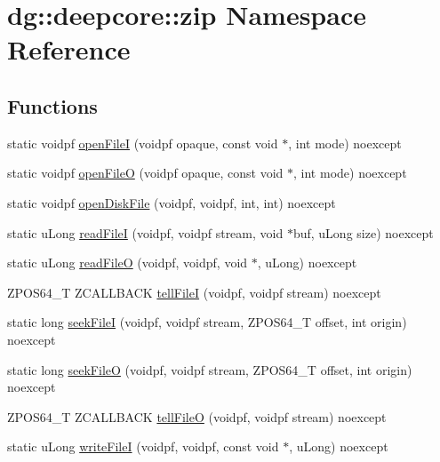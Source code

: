 \hypertarget{namespacedg_1_1deepcore_1_1zip}{}\section{dg\+:\+:deepcore\+:\+:zip Namespace Reference}
\label{namespacedg_1_1deepcore_1_1zip}
\subsection*{Functions}
\begin{DoxyCompactItemize}
\item 
static voidpf \hyperlink{namespacedg_1_1deepcore_1_1zip_a3bc0ad7151257370d5b5751db50e2d39}{open\+FileI} (voidpf opaque, const void $\ast$, int mode) noexcept
\item 
static voidpf \hyperlink{namespacedg_1_1deepcore_1_1zip_a878b1c478e1a8e98b5f336c7f6d0a231}{open\+FileO} (voidpf opaque, const void $\ast$, int mode) noexcept
\item 
static voidpf \hyperlink{namespacedg_1_1deepcore_1_1zip_a078759b4d07a1c6c6cc4b17132578548}{open\+Disk\+File} (voidpf, voidpf, int, int) noexcept
\item 
static u\+Long \hyperlink{namespacedg_1_1deepcore_1_1zip_a3e78fbd84887ab1c1516259b26009859}{read\+FileI} (voidpf, voidpf stream, void $\ast$buf, u\+Long size) noexcept
\item 
static u\+Long \hyperlink{namespacedg_1_1deepcore_1_1zip_a0e1d4008cad56f6689c8724f136df8f3}{read\+FileO} (voidpf, voidpf, void $\ast$, u\+Long) noexcept
\item 
Z\+P\+O\+S64\+\_\+T Z\+C\+A\+L\+L\+B\+A\+CK \hyperlink{namespacedg_1_1deepcore_1_1zip_adbe9432ab30843acf008ac2577c29dae}{tell\+FileI} (voidpf, voidpf stream) noexcept
\item 
static long \hyperlink{namespacedg_1_1deepcore_1_1zip_af39353ad520f2fca5c23baa4092c5a41}{seek\+FileI} (voidpf, voidpf stream, Z\+P\+O\+S64\+\_\+T offset, int origin) noexcept
\item 
static long \hyperlink{namespacedg_1_1deepcore_1_1zip_a0ec30105dd1680acc24aeb31abed3e11}{seek\+FileO} (voidpf, voidpf stream, Z\+P\+O\+S64\+\_\+T offset, int origin) noexcept
\item 
Z\+P\+O\+S64\+\_\+T Z\+C\+A\+L\+L\+B\+A\+CK \hyperlink{namespacedg_1_1deepcore_1_1zip_aa425c4e566755e9babe45a89687107e8}{tell\+FileO} (voidpf, voidpf stream) noexcept
\item 
static u\+Long \hyperlink{namespacedg_1_1deepcore_1_1zip_a237f3ae68caea82b512319cccc05ae29}{write\+FileI} (voidpf, voidpf, const void $\ast$, u\+Long) noexcept

\end{DoxyCompactItemize}
